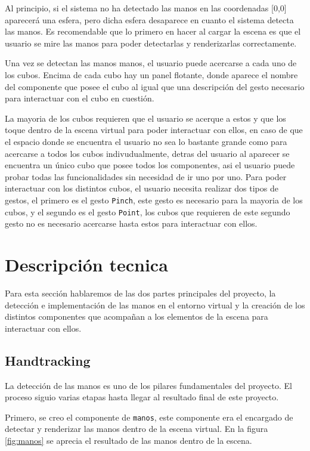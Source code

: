 \documentclass[a4paper, 12pt]{book}
\begin{document}
Al principio, si el sistema no ha detectado las manos en las coordenadas [0,0] aparecerá una esfera, pero dicha esfera desaparece en cuanto el sistema detecta las manos. Es recomendable que lo primero en hacer al cargar la escena es que el usuario se mire las manos para poder detectarlas y renderizarlas correctamente. 

Una vez se detectan las manos manos, el usuario puede acercarse a cada uno de los cubos. Encima de cada cubo hay un panel flotante, donde aparece el nombre del componente que posee el cubo al igual que una descripción del gesto necesario para interactuar con el cubo en cuestión. 

La mayoria de los cubos requieren que el usuario se acerque a estos y que los toque dentro de la escena virtual para poder interactuar con ellos, en caso de que el espacio donde se encuentra el usuario no sea lo bastante grande como para acercarse a todos los cubos indivudualmente, detras del usuario al aparecer se encuentra un único cubo que posee todos los componentes, asi el usuario puede probar todas las funcionalidades sin necesidad de ir uno por uno. 
Para poder interactuar con los distintos cubos, el usuario necesita realizar dos tipos de gestos, el primero es el gesto \texttt{Pinch}, este gesto es necesario para la mayoria de los cubos, y el segundo es el gesto \texttt{Point}, los cubos que requieren de este segundo gesto no es necesario acercarse hasta estos para interactuar con ellos. 
\section{Descripción tecnica}
\label{sec:descripcion-tecnica}

Para esta sección hablaremos de las dos partes principales del proyecto, la detección e implementación de las manos en el entorno virtual y la creación de los distintos componentes que acompañan a los elementos de la escena para interactuar con ellos.

\subsection{Handtracking}
\label{subsec:handtracking}
La detección de las manos es uno de los pilares fundamentales del proyecto. El proceso siguio varias etapas hasta llegar al resultado final de este proyecto.

Primero, se creo el componente de \texttt{manos}, este componente era el encargado de detectar y renderizar las manos dentro de la escena virtual. En la figura \ref{fig:manos} se aprecia el resultado de las manos dentro de la escena.
\end{document}

